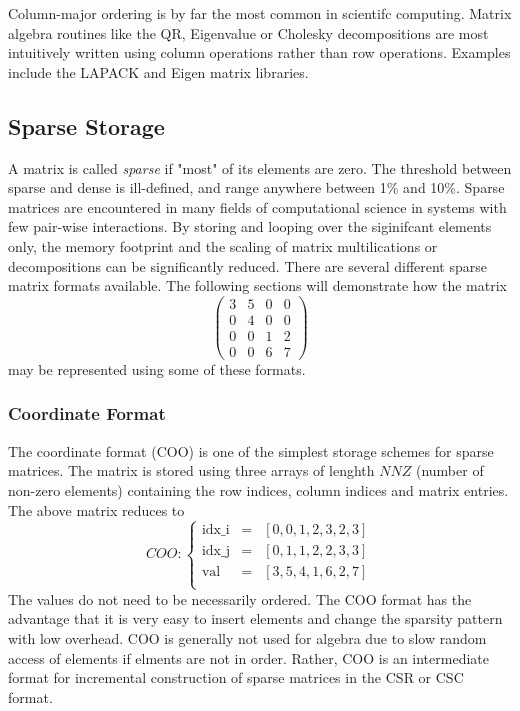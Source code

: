 Column-major ordering is by far the most common in scientifc computing. Matrix algebra routines like the QR, Eigenvalue or Cholesky decompositions are most intuitively written using column operations rather than row operations. Examples include the LAPACK and Eigen matrix libraries. 

\subsection{Sparse Storage}

A matrix is called \emph{sparse} if "most" of its elements are zero. The threshold between sparse and dense is ill-defined, and range anywhere between 1\% and 10\%. Sparse matrices are encountered in many fields of computational science in systems with few pair-wise interactions. By storing and looping over the siginifcant elements only, the memory footprint and the scaling of matrix multilications or decompositions can be significantly reduced. There are several different sparse matrix formats available. The following sections will demonstrate how the matrix
\begin{equation*}
\begin{pmatrix}
3 & 5 & 0 & 0 \\
0 & 4 & 0 & 0 \\
0 & 0 & 1 & 2 \\
0 & 0 & 6 & 7 
\end{pmatrix}
\end{equation*}
\noindent may be represented using some of these formats.

\subsubsection{Coordinate Format}

The coordinate format (COO) is one of the simplest storage schemes for sparse matrices. The matrix is stored using three arrays of lenghth $NNZ$ (number of non-zero elements) containing the row indices, column indices and matrix entries. The above matrix reduces to 
\begin{equation*}
COO: \left\lbrace
\begin{matrix}
\textrm{idx\_i} &= &\left[ 0, 0, 1, 2, 3, 2, 3 \right] \\
\textrm{idx\_j} &= &\left[ 0, 1, 1, 2, 2, 3, 3 \right] \\
\textrm{val}   &= &\left[ 3, 5, 4, 1, 6, 2, 7 \right] \\
\end{matrix}
\right.
\end{equation*}
\noindent The values do not need to be necessarily ordered. The COO format has the advantage that it is very easy to insert elements and change the sparsity pattern with low overhead. COO is generally not used for algebra due to slow random access of elements if elments are not in order. Rather, COO is an intermediate format for incremental construction of sparse matrices in the CSR or CSC format.


